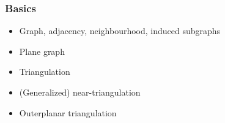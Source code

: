 \documentclass{beamer}
\newcommand{\emphh}[1]{\textcolor{blue}{\emph{#1}}}
\begin{document}
%
%
%
%
%

\begin{frame}
  \frametitle{Basics}

  \begin{itemize}
    \item Graph, adjacency, neighbourhood, induced subgraphs
    \item Plane graph
    \item Triangulation
    \item (Generalized) near-triangulation
    \item Outerplanar triangulation
  \end{itemize}
\end{frame}
\end{document}
